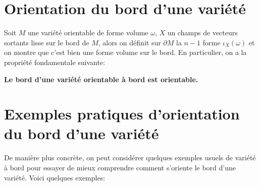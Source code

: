    \section{Orientation du bord d'une variété}
      Soit $M$ une variété orientable de forme volume $\omega$, $X$ un champs de vecteurs sortants lisse sur le bord de \( M \), alors on définit sur $\partial M$ la $n-1$ forme $\iota_X(\omega)$ et on montre que c'est bien une forme volume sur le bord. En particulier, on a la propriété fondamentale suivante:
      \begin{center}
         \textbf{Le bord d'une variété orientable à bord est orientable.}
      \end{center}
   \section{Exemples pratiques d'orientation du bord d'une variété}
      De manière plus concrète, on peut considérer quelques exemples usuels de variété à bord pour essayer de mieux comprendre comment s'oriente le bord d'une variété. Voici quelques exemples:
